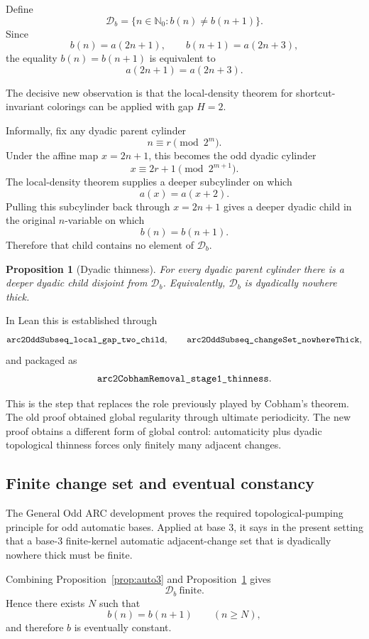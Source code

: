 \documentclass[11pt]{article}
\newtheorem{proposition}[theorem]{Proposition}
\theoremstyle{remark}
\newcommand{\Nzero}{\mathbb{N}_0}
\newcommand{\code}[1]{\texttt{\detokenize{#1}}}
\newcommand{\Change}{\mathcal{D}}
\begin{document}
Define
\[
\Change_b
=
\{n\in\Nzero : b(n)\ne b(n+1)\}.
\]
Since
\[
b(n)=a(2n+1),
\qquad
b(n+1)=a(2n+3),
\]
the equality $b(n)=b(n+1)$ is equivalent to
\begin{equation}\label{eq:gap2}
a(2n+1)=a(2n+3).
\end{equation}

The decisive new observation is that the local-density theorem for
shortcut-invariant colorings can be applied with gap $H=2$.

Informally, fix any dyadic parent cylinder
\[
n\equiv r\pmod{2^m}.
\]
Under the affine map $x=2n+1$, this becomes the odd dyadic cylinder
\[
x\equiv 2r+1\pmod{2^{m+1}}.
\]
The local-density theorem supplies a deeper subcylinder on which
\[
a(x)=a(x+2).
\]
Pulling this subcylinder back through $x=2n+1$ gives a deeper dyadic child in
the original $n$-variable on which
\[
b(n)=b(n+1).
\]
Therefore that child contains no element of $\Change_b$.

\begin{proposition}[Dyadic thinness]\label{prop:thin}
For every dyadic parent cylinder there is a deeper dyadic child disjoint from
$\Change_b$.  Equivalently, $\Change_b$ is dyadically nowhere thick.
\end{proposition}

In Lean this is established through
\[
\code{arc2OddSubseq_local_gap_two_child},
\qquad
\code{arc2OddSubseq_changeSet_nowhereThick},
\]
and packaged as
\[
\code{arc2CobhamRemoval_stage1_thinness}.
\]

This is the step that replaces the role previously played by Cobham's theorem.
The old proof obtained global regularity through ultimate periodicity.
The new proof obtains a different form of global control: automaticity plus
dyadic topological thinness forces only finitely many adjacent changes.

\subsection{Finite change set and eventual constancy}

The General Odd ARC development proves the required topological-pumping
principle for odd automatic bases.  Applied at base $3$, it says in the present
setting that a base-$3$ finite-kernel automatic adjacent-change set that is
dyadically nowhere thick must be finite.

Combining Proposition~\ref{prop:auto3} and Proposition~\ref{prop:thin} gives
\[
\Change_b\ \text{finite}.
\]
Hence there exists $N$ such that
\[
b(n)=b(n+1)\qquad(n\ge N),
\]
and therefore $b$ is eventually constant.
\end{document}
